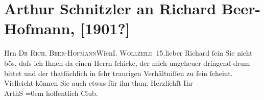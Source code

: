

         
         \renewcommand{\erwaehntePersonen}{Personen:  ?? [Person in traurigen Verhältnissen], Richard Beer-Hofmann}
         \renewcommand{\erwaehnteInstitutionen}{Institutionen: Wiener Schachclub}
         \renewcommand{\erwaehnteOrte}{Orte: Wien, Wollzeile}
         \renewcommand{\erwaehnteWerke}{}
               \section[Arthur Schnitzler an Richard Beer-Hofmann, {[}1901?{]}]{ Arthur Schnitzler an Richard Beer-Hofmann, {[}1901?{]}}\nopagebreak{}\rehead{ }\begin{ledgroupsized}[t]{13cm}\normalsize\beginnumbering \toendnotes[C]{\smallbreak\pagebreak[2]} 
\toendnotes[C]{\smallbreak}\pstart{}{\pb}Hrn \textsc{Dr Rich.
                     Beer-Hofmann}\pend{}\pstart{}Wien\pend{}\pstart{}\textsc{I. Wollzeile 15}.\pend{}{\bigskip}\pstart{}{\pb}lieber Richard\pend\pstart
           ſein Sie nicht bös, daſs ich Ihnen da einen Herrn ſchicke, der mich ungeheuer dringend drum bittet und
               der thatſächlich {\pb}in ſehr traurigen Verhältniſſen zu
               ſein ſcheint. Vielleicht können Sie auch etwas für ihn thun.\pend
           \pstart
           {\pb}Herzlichſt Ihr{\\[\baselineskip]}\spacefill\mbox{ArthS}\pend
           \leftskip=0em{}\pstart
           \noindent{}\label{K_L01089-1v}\label{K_L01089-1h} hoffentlich Club.\pend
           
         
         \endnumbering{}\end{ledgroupsized}  \newcommand{\dateiname}{L01089}\newcommand{\titel}{Arthur Schnitzler an Richard Beer-Hofmann, [1901?]}\newcommand{\editorInnen}{Martin Anton Müller und Gerd-Hermann Susen}
      
